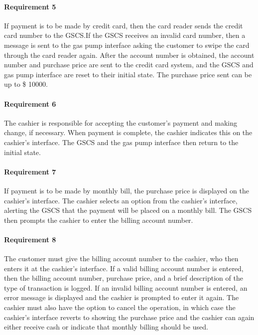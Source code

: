 \documentclass[11pt, a4paper]{article}
\begin{document}
    \begin{framed}
    \end{framed}

    \paragraph{Requirement 5} If payment is to be made by credit card, then the
    card reader sends the credit card number to the GSCS.\@ If the GSCS receives
    an invalid card number, then a message is sent to the gas pump interface
    asking the customer to swipe the card through the card reader again. After
    the account number is obtained, the account number and purchase price are
    sent to the credit card system, and the GSCS and gas pump interface are
    reset to their initial state. The purchase price sent can be up to \$ 10000.

    \begin{framed}
    \end{framed}

    \paragraph{Requirement 6} The cashier is responsible for accepting the
    customer's payment and making change, if necessary. When payment is
    complete, the cashier indicates this on the cashier's interface. The GSCS
    and the gas pump interface then return to the initial state.

    \begin{framed}
    \end{framed}

    \paragraph{Requirement 7} If payment is to be made by monthly bill, the
    purchase price is displayed on the cashier's interface. The cashier
    selects an option from the cashier's interface, alerting the GSCS that the
    payment will be placed on a monthly bill. The GSCS then prompts the cashier
    to enter the billing account number.

    \begin{framed}
    \end{framed}

    \paragraph{Requirement 8} The customer must give the billing account number
    to the cashier, who then enters it at the cashier's interface. If a valid
    billing account number is entered, then the billing account number, purchase
    price, and a brief description of the type of transaction is logged. If an
    invalid billing account number is entered, an error message is displayed
    and the cashier is prompted to enter it again. The cashier must also have
    the option to cancel the operation, in which case the cashier's interface
    reverts to showing the purchase price and the cashier can again either
    receive cash or indicate that monthly billing should be used.
\end{document}
